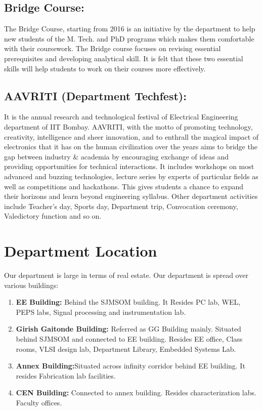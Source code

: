\documentclass[openany]{book} %
\begin{document}
\section {Bridge Course:}
The Bridge Course, starting from 2016 is an initiative by the department to help new students of the M. Tech. and PhD programs which makes them comfortable with their coursework. The Bridge course focuses on revising essential prerequisites and developing analytical skill. It is felt that these two essential skills will help students to work on their courses more effectively.\newline
\section {AAVRITI (Department Techfest):}
It is the annual research and technological festival of Electrical Engineering department of IIT Bombay. AAVRITI, with the motto of promoting technology, creativity, intelligence and sheer innovation, and to enthrall the magical impact of electronics that it has on the human civilization over the years aims to bridge the gap between industry \& academia by encouraging exchange of ideas and providing opportunities for technical interactions.\newline
It includes workshops on most advanced and buzzing technologies, lecture series by experts of particular fields as well as competitions and hackathons. This gives students a chance to expand their horizons and learn beyond engineering syllabus.\newline
Other department activities include Teacher’s day, Sports day, Department trip, Convocation ceremony, Valedictory function and so on.
\chapter{Department Location }
Our department is large in terms of real estate. Our department is spread over various buildings: \newline
\begin{enumerate}
    \item  \textbf{EE Building:} \newline  Behind the SJMSOM building. It Resides PC lab, WEL, PEPS labs, Signal processing and instrumentation lab.
    \item  \textbf{Girish Gaitonde Building:} \newline Referred as GG Building mainly. Situated behind SJMSOM and connected to EE building. Resides EE office, Class rooms, VLSI design lab, Department Library, Embedded Systems Lab.
    \item \textbf{Annex Building:}\newline  Situated across infinity corridor behind EE building. It resides Fabrication lab facilities.
    \item \textbf{CEN Building:} \newline Connected to annex building. Resides characterization labs. Faculty offices.
\end{enumerate}
\end{document}
